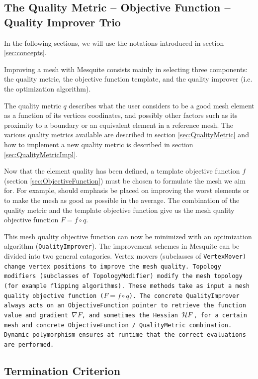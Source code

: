 \subsection{The Quality Metric -- Objective Function -- Quality Improver Trio} 
\label{sec:trio}

In the following sections, we will use the notations introduced in section \ref{sec:concepts}. 

Improving a mesh with Mesquite consists mainly in selecting three components: the quality metric,
the objective function template, and the quality improver (i.e. the optimization algorithm). 

The quality metric $q$ describes what the user considers to be a good mesh element as a function of
its vertices coodinates, and possibly other factors such as its proximity to a boundary or an
equivalent element in a reference mesh. The various quality metrics available are described in
section \ref{sec:QualityMetric} and how to implement a new quality metric is described in section
\ref{sec:QualityMetricImpl}.

Now that the element quality has been defined, a template objective function $f$ (section
\ref{sec:ObjectiveFunction}) must be chosen to formulate the mesh we aim for. For example,
should emphasis be placed on improving the worst elements or to make the mesh
as good as possible in the average. The combination of the
quality metric and the template objective function give us the mesh quality objective function $F=f
\circ q$.

This mesh quality objective function can now be minimized with an optimization algorithm
(\texttt{QualityImprover}).  The improvement schemes in Mesquite can be divided
into two general catagories.  Vertex movers (subclasses of \tt{VertexMover}) 
change vertex positions to improve the mesh quality.  Topology modifiers (subclasses
of \tt{TopologyModifier}) modify the mesh topology (for example flipping algorithms).
These methods take as input a mesh quality objective function ($F=f \circ q$).
The concrete \texttt{QualityImprover} always acts on an
\texttt{ObjectiveFunction} pointer to retrieve the function value and
gradient $\nabla F$, and sometimes the Hessian ${\cal H} F$, for a certain mesh and concrete \texttt{ObjectiveFunction} /
\texttt{QualityMetric} combination.  Dynamic polymorphism ensures at
runtime that the correct evaluations are performed.


\subsection{Termination Criterion}
\label{termination_section}

